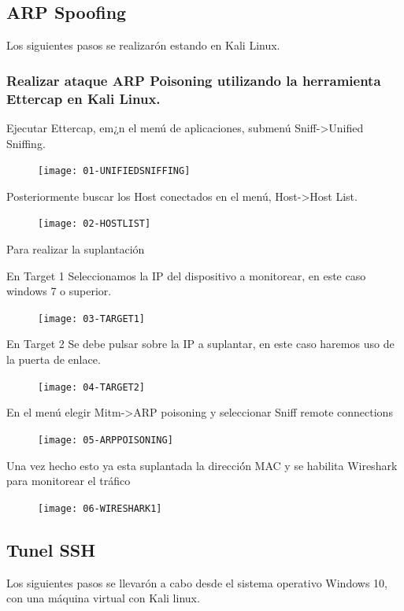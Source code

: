 \documentclass{article}
\begin{document}
\subsection{ARP Spoofing}
Los siguientes pasos se realizar\'on estando en Kali Linux.
\subsubsection{Realizar ataque ARP Poisoning utilizando la herramienta Ettercap en Kali Linux.}
Ejecutar Ettercap, em¿n el men\'u de aplicaciones, submen\'u Sniff->Unified Sniffing.
\begin{figure}[H]
\centering
\texttt{[image: 01-UNIFIEDSNIFFING]}
\end{figure}

Posteriormente buscar los Host conectados en el men\'u, Host->Host List.
\begin{figure}[H]
\centering
\texttt{[image: 02-HOSTLIST]}
\end{figure}

Para realizar la suplantaci\'on 

En Target 1 Seleccionamos la IP del dispositivo a monitorear, en este caso windows 7 o superior.

\begin{figure}[H]
\centering
\texttt{[image: 03-TARGET1]}
\end{figure}

En Target 2 Se debe pulsar sobre la IP a suplantar, en este caso haremos uso de la puerta de enlace.
\begin{figure}[H]
\centering
\texttt{[image: 04-TARGET2]}
\end{figure}

En el men\'u elegir Mitm->ARP poisoning  y seleccionar Sniff remote connections
\begin{figure}[H]
\centering
\texttt{[image: 05-ARPPOISONING]}
\end{figure}

Una vez hecho esto ya esta suplantada la direcci\'ón MAC y se habilita Wireshark para monitorear el tr\'afico
\begin{figure}[H]
\centering
\texttt{[image: 06-WIRESHARK1]}
\end{figure}



\subsection{Tunel SSH}
Los siguientes pasos se llevarón a cabo desde el sistema operativo Windows 10, con una m\'aquina virtual con Kali linux.
\end{document}
